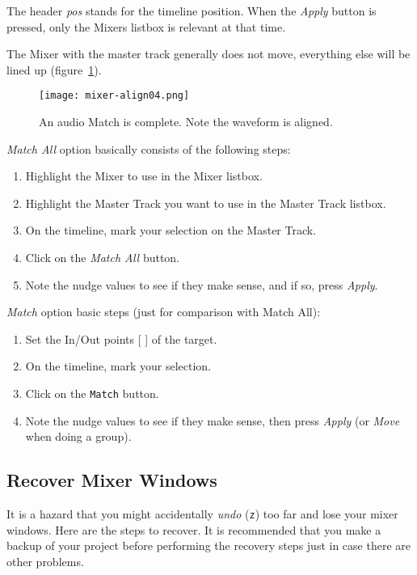 The header \textit{pos} stands for the timeline position. When the \textit{Apply} button is pressed, only the Mixers listbox is relevant at that time.

The Mixer with the master track generally does not move, everything else will be lined up (figure~\ref{fig:mixer-align04}).

\begin{figure}[htpb]
    \centering
    \texttt{[image: mixer-align04.png]}
    \caption{An audio Match is complete. Note the waveform is aligned.}
    \label{fig:mixer-align04}
\end{figure}

\textit{Match All} option basically consists of the following steps:

\begin{enumerate}
    \item Highlight the Mixer to use in the Mixer listbox.
    \item Highlight the Master Track you want to use in the Master Track listbox.
    \item On the timeline, mark your selection on the Master Track.
    \item Click on the \textit{Match All} button.
    \item Note the nudge values to see if they make sense, and if so, press \textit{Apply}.
\end{enumerate}

\textit{Match} option basic steps (just for comparison with Match All):

\begin{enumerate}
    \item Set the In/Out points [ ] of the target.
    \item On the timeline, mark your selection.
    \item Click on the \texttt{Match} button.
    \item Note the nudge values to see if they make sense, then press \textit{Apply} (or \textit{Move} when doing a group).
\end{enumerate}

\subsection{Recover Mixer Windows}%
\label{sub:recover_mixer_windows}

It is a hazard that you might accidentally \textit{undo} (\texttt{z}) too far and lose your mixer windows.  Here are the steps to recover.  It is recommended that you make a backup of your project before performing the recovery steps just in case there are other problems.

